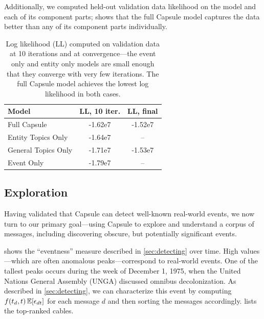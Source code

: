 Additionally, we computed held-out validation data likelihood on the model and each of its component parts;  shows that the full Capsule model captures the data better than any of its component parts individually.
\begin{table}[bt]
\centering
\begin{tabular}{l c c}
\toprule
\textbf{Model} & \textbf{LL, 10 iter.} & \textbf{LL, final} \\
\midrule
Full Capsule & -1.62e7 & -1.52e7 \\
Entity Topics Only & -1.64e7 & -- \\
General Topics Only & -1.71e7 & -1.53e7 \\
Event Only & -1.79e7 & -- \\
\bottomrule
\end{tabular}
\caption{Log likelihood (LL) computed on validation data at 10 iterations and at convergence---the event only and entity only models are small enough that they converge with very few iterations. The full Capsule model achieves the lowest log likelihood in both cases.}
\label{table:cables:ll}
\end{table}

\subsection{Exploration}

Having validated that Capsule can detect well-known real-world events, we now
turn to our primary goal---using Capsule to explore and understand a
corpus of messages, including discovering obscure, but potentially significant events.

 shows the ``eventness'' measure described in
\cref{sec:detecting} over time. High values---which are often
anomalous peaks---correspond to real-world events. One of the tallest
peaks occurs during the week of December 1, 1975, when the United
Nations General Assembly (UNGA) discussed omnibus decolonization. As
described in \cref{sec:detecting}, we can characterize this event by
computing $f(t_d, t)\,\mathbb{E}[\epsilon_{dt}]$ for each message $d$ and then
sorting the messages accordingly.  lists the
top-ranked cables.

